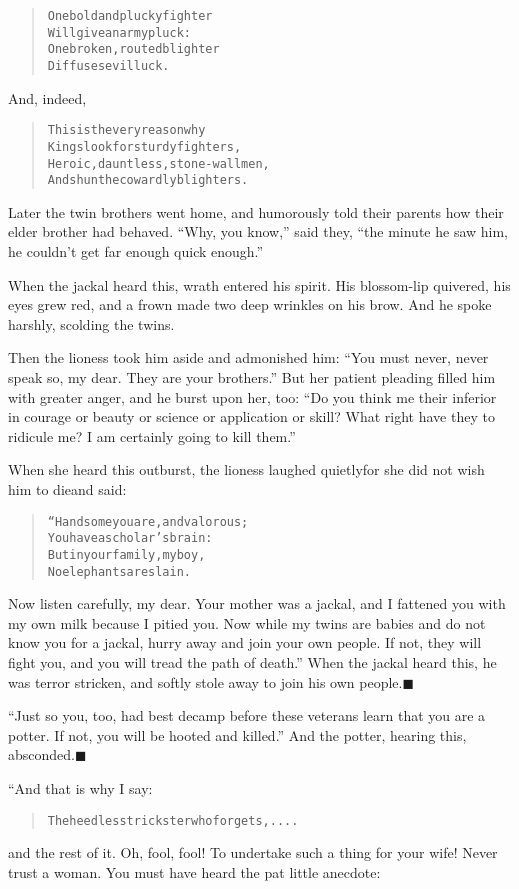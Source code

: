 \documentclass[article, twoside, 14pt]{memoir}
\newcommand{\qed}{\hfill \ensuremath{\blacksquare}}
\renewenvironment{verbatim}{%
\begin{quote}%
\vskip -10pt%
\begin{alltt}\normalfont\large}{\end{alltt}%
\end{quote}%
\vskip -10pt
} %
\begin{document}
\begin{verbatim}
One bold and plucky fighter
    Will give an army pluck:
One broken, routed blighter
    Diffuses evil luck.
\end{verbatim}
And, indeed,

\begin{verbatim}
This is the very reason why
    Kings look for sturdy fighters,
Heroic, dauntless, stone-wall men,
    And shun the cowardly blighters.
\end{verbatim}
Later the twin brothers went home, and humorously told their
parents how their elder brother had behaved. ``Why, you know,''
said they,
``the minute he saw him, he couldn't get far enough quick enough.''


When the jackal heard this, wrath entered his spirit. His
blossom-lip quivered, his eyes grew red, and a frown made two deep
wrinkles on his brow. And he spoke harshly, scolding the twins.

Then the lioness took him aside and admonished him:
``You must never, never speak so, my dear. They are your brothers.''
But her patient pleading filled him with greater anger, and he
burst upon her, too:
``Do you think me their inferior in courage or beauty or science or application or skill? What right have they to ridicule me? I am certainly going to kill them.''

When she heard this outburst, the lioness laughed quietly{\textemdash}for she
did not wish him to die{\textemdash}and said:

\begin{verbatim}
“Handsome you are, and valorous;
    You have a scholar's brain:
But in your family, my boy,
    No elephants are slain.
\end{verbatim}
Now listen carefully, my dear. Your mother was a jackal, and I
fattened you with my own milk because I pitied you. Now while my
twins are babies and do not know you for a jackal, hurry away and
join your own people. If not, they will fight you, and you will
tread the path of death.” When the jackal heard this, he was terror
stricken, and softly stole away to join his own
people.\hyperref[s70]{\qed}

``Just so you, too, had best decamp before these veterans learn that you are a potter. If not, you will be hooted and killed.''
And the potter, hearing this, absconded.\hyperref[s69]{\qed}

“And that is why I say:

\begin{verbatim}
The heedless trickster who forgets, ....
\end{verbatim}
and the rest of it. Oh, fool, fool! To undertake such a thing for
your wife! Never trust a woman. You must have heard the pat little
anecdote:
\end{document}
